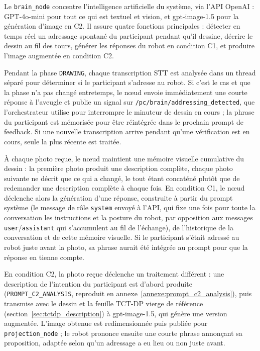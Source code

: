 \documentclass[11pt]{article}
\begin{document}
Le \texttt{brain\_node} concentre l'intelligence artificielle du système, via l'API OpenAI : GPT-4o-mini pour tout ce qui est textuel et vision, et gpt-image-1.5 pour la génération d'image en C2. Il assure quatre fonctions principales : détecter en temps réel un adressage spontané du participant pendant qu'il dessine, décrire le dessin au fil des tours, générer les réponses du robot en condition C1, et produire l'image augmentée en condition C2.

Pendant la phase \texttt{DRAWING}, chaque transcription STT est analysée dans un thread séparé pour déterminer si le participant s'adresse au robot. Si c'est le cas et que la phase n'a pas changé entretemps, le nœud envoie immédiatement une courte réponse à l'aveugle et publie un signal sur \texttt{/pc/brain/addressing\_detected}, que l'orchestrateur utilise pour interrompre le minuteur de dessin en cours ; la phrase du participant est mémorisée pour être réintégrée dans le prochain prompt de feedback. Si une nouvelle transcription arrive pendant qu'une vérification est en cours, seule la plus récente est traitée.

À chaque photo reçue, le nœud maintient une mémoire visuelle cumulative du dessin : la première photo produit une description complète, chaque photo suivante ne décrit que ce qui a changé, le tout étant concaténé plutôt que de redemander une description complète à chaque fois. En condition C1, le nœud déclenche alors la génération d'une réponse, construite à partir du prompt système (le message de rôle \texttt{system} envoyé à l'API, qui fixe une fois pour toute la conversation les instructions et la posture du robot, par opposition aux messages \texttt{user}/\texttt{assistant} qui s'accumulent au fil de l'échange), de l'historique de la conversation et de cette mémoire visuelle. Si le participant s'était adressé au robot juste avant la photo, sa phrase aurait été intégrée au prompt pour que la réponse en tienne compte.

En condition C2, la photo reçue déclenche un traitement différent : une description de l'intention du participant est d'abord produite (\texttt{PROMPT\_C2\_ANALYSIS}, reproduit en annexe~\ref{annexe:prompt_c2_analysis}), puis transmise avec le dessin et la feuille TCT-DP vierge de référence (section~\ref{sec:tctdp_description}) à gpt-image-1.5, qui génère une version augmentée. L'image obtenue est redimensionnée puis publiée pour \texttt{projection\_node} ; le robot prononce ensuite une courte phrase annonçant sa proposition, adaptée selon qu'un adressage a eu lieu ou non juste avant.
\end{document}
